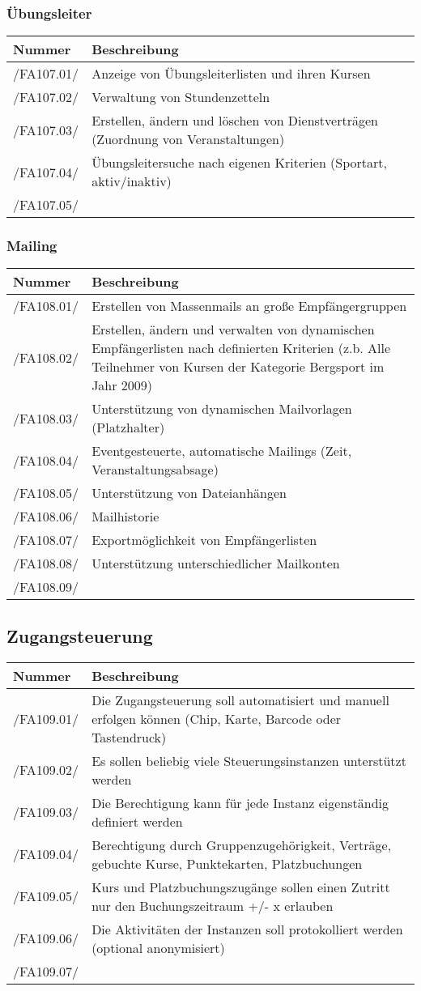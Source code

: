 \documentclass[a4paper,11pt]{article}
\newcommand\addrow[2]{#1 &#2\\ }
\newcommand\addheading[2]{#1 &#2\\ \hline}
\newcommand\tabularhead{\begin{tabular}{lp{13cm}}
\hline
}
\newenvironment{usecase}{\tabularhead}
{\hline\end{tabular}}
\begin{document}
\subsubsection{Übungsleiter}
\begin{usecase}
  \addheading{Nummer}{Beschreibung} 
  \addrow{/FA107.01/}{Anzeige von Übungsleiterlisten und ihren Kursen}
  \addrow{/FA107.02/}{Verwaltung von Stundenzetteln}
  \addrow{/FA107.03/}{Erstellen, ändern und löschen von Dienstverträgen (Zuordnung von Veranstaltungen)}
  \addrow{/FA107.04/}{Übungsleitersuche nach eigenen Kriterien (Sportart, aktiv/inaktiv)}
  \addrow{/FA107.05/}{}
\end{usecase}

\subsubsection{Mailing}
\begin{usecase}
  \addheading{Nummer}{Beschreibung} 
  \addrow{/FA108.01/}{Erstellen von Massenmails an große Empfängergruppen}
  \addrow{/FA108.02/}{Erstellen, ändern und verwalten von dynamischen Empfängerlisten nach definierten Kriterien (z.b. Alle Teilnehmer von Kursen der Kategorie Bergsport im Jahr 2009)}
  \addrow{/FA108.03/}{Unterstützung von dynamischen Mailvorlagen (Platzhalter)}
  \addrow{/FA108.04/}{Eventgesteuerte, automatische Mailings (Zeit, Veranstaltungsabsage)}
  \addrow{/FA108.05/}{Unterstützung von Dateianhängen}
  \addrow{/FA108.06/}{Mailhistorie}
  \addrow{/FA108.07/}{Exportmöglichkeit von Empfängerlisten}
  \addrow{/FA108.08/}{Unterstützung unterschiedlicher Mailkonten}
  \addrow{/FA108.09/}{}
\end{usecase}

\subsection{Zugangsteuerung}
\begin{usecase}
  \addheading{Nummer}{Beschreibung} 
  \addrow{/FA109.01/}{Die Zugangsteuerung soll automatisiert und manuell erfolgen können (Chip, Karte, Barcode oder Tastendruck)}
  \addrow{/FA109.02/}{Es sollen beliebig viele Steuerungsinstanzen unterstützt werden}
  \addrow{/FA109.03/}{Die Berechtigung kann für jede Instanz eigenständig definiert werden}
  \addrow{/FA109.04/}{Berechtigung durch Gruppenzugehörigkeit, Verträge, gebuchte Kurse, Punktekarten, Platzbuchungen}
  \addrow{/FA109.05/}{Kurs und Platzbuchungszugänge sollen einen Zutritt nur den Buchungszeitraum +/- x erlauben}
  \addrow{/FA109.06/}{Die Aktivitäten der Instanzen soll protokolliert werden (optional anonymisiert)}
  \addrow{/FA109.07/}{}
\end{usecase}
\end{document}
